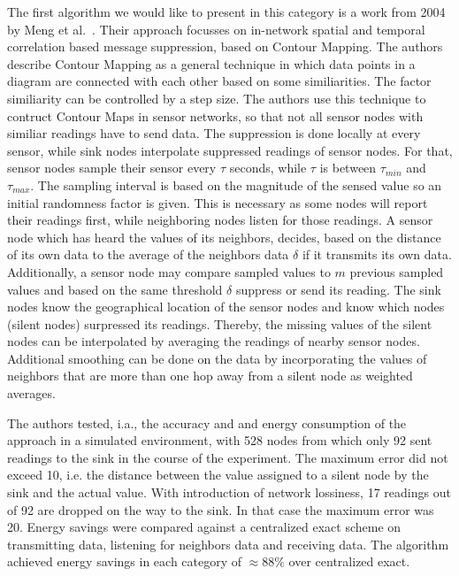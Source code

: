 The first algorithm we would like to present in this category is a work from
2004 by Meng et al.~\cite{meng2004event}. Their approach focusses on in-network
spatial and temporal correlation based message suppression, based on Contour
Mapping. The authors describe Contour Mapping as a general technique in which
data points in a diagram are connected with each other based on some
similiarities. The factor similiarity can be controlled by a step size. The
authors use this technique to contruct Contour Maps in sensor networks, so that
not all sensor nodes with similiar readings have to send data. The suppression
is done locally at every sensor, while sink nodes interpolate suppressed
readings of sensor nodes. For that, sensor nodes sample their sensor every $
\tau $ seconds, while $ \tau $ is between $ \tau_{min} $ and $ \tau_{max} $.
The sampling interval is based on the magnitude of the sensed value so an
initial randomness factor is given. This is necessary as some nodes will report
their readings first, while neighboring nodes listen for those readings. A
sensor node which has heard the values of its neighbors, decides, based on the
distance of its own data to the average of the neighbors data $ \delta $ if it
transmits its own data. Additionally, a sensor node may compare sampled values
to $ m $ previous sampled values and based on the same threshold $ \delta $
suppress or send its reading. The sink nodes know the geographical location of
the sensor nodes and know which nodes (silent nodes) surpressed its readings.
Thereby, the missing values of the silent nodes can be interpolated by
averaging the readings of nearby sensor nodes. Additional smoothing can be done
on the data by incorporating the values of neighbors that are more than one hop
away from a silent node as weighted averages.

The authors tested, i.a., the accuracy and and energy consumption of the
approach in a simulated environment, with 528 nodes from which only 92 sent
readings to the sink in the course of the experiment. The maximum error did not
exceed 10, i.e. the distance between the value assigned to a silent node by the
sink and the actual value. With introduction of network lossiness, 17 readings
out of 92 are dropped on the way to the sink. In that case the maximum error
was 20. Energy savings were compared against a centralized exact scheme on
transmitting data, listening for neighbors data and receiving data. The
algorithm achieved energy savings in each category of $ \approx88\% $ over
centralized exact. 


